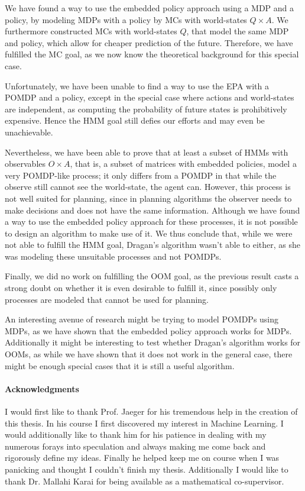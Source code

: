 \documentclass{article}
\theoremstyle{definition}
\begin{document}
We have found a way to use the embedded policy approach using a MDP and a policy, by modeling MDPs with a policy by MCs with world-states $Q\times A$. We furthermore constructed MCs with world-states $Q$, that model the same MDP and policy, which allow for cheaper prediction of the future. Therefore, we have fulfilled the MC goal, as we now know the theoretical background for this special case. 

Unfortunately, we have been unable to find a way to use the EPA with a POMDP and a policy, except in the special case where actions and world-states are independent, as computing the probability of future states is prohibitively expensive. Hence the HMM goal still defies our efforts and may even be unachievable.  

Nevertheless, we have been able to prove that at least a subset of HMMs with observables $O\times A$, that is, a subset of matrices with embedded policies, model a very POMDP-like process; it only differs from a POMDP in that while the observe still cannot see the world-state, the agent can. However, this process is not well suited for planning, since in planning algorithms the observer needs to make decisions and does not have the same information. Although we have found a way to use the embedded policy approach for these processes, it is not possible to design an algorithm to make use of it. We thus conclude that, while we were not able to fulfill the HMM goal, Dragan's algorithm wasn't able to either, as she was modeling these unsuitable processes and not POMDPs. 

Finally, we did no work on fulfilling the OOM goal, as the previous result casts a strong doubt on whether it is even desirable to fulfill it, since possibly only processes are modeled that cannot be used for planning.

An interesting avenue of research might be trying to model POMDPs using MDPs, as we have shown that the embedded policy approach works for MDPs. Additionally it might be interesting to test whether Dragan's algorithm works for OOMs, as while we have shown that it does not work in the general case, there might be enough special cases that it is still a useful algorithm.

\paragraph{Acknowledgments}
I would first like to thank Prof. Jaeger for his tremendous help in the creation of this
thesis. In his course I first discovered my interest in Machine Learning. I would
additionally like to thank him for his patience in dealing with my numerous forays into
speculation and always making me come back and rigorously define my ideas. Finally he
helped keep me on course when I was panicking and thought I couldn't finish my thesis.
Additionally I would like to thank Dr. Mallahi Karai for being available as a mathematical
co-supervisor.



\end{document}
